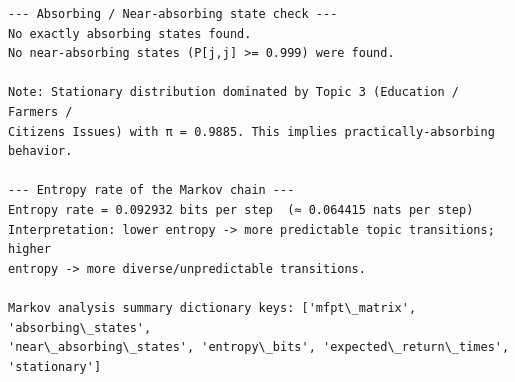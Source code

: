 \documentclass[11pt]{article}
\makeatletter
\newcommand{\boxspacing}{\kern\kvtcb@left@rule\kern\kvtcb@boxsep}
\newcommand{\prompt}[4]{
        {\ttfamily\llap{{\color{#2}[#3]:\hspace{3pt}#4}}\vspace{-\baselineskip}}
    }
\makeatother
\begin{document}
\begin{Verbatim}[commandchars=\\\{\}]
--- Absorbing / Near-absorbing state check ---
No exactly absorbing states found.
No near-absorbing states (P[j,j] >= 0.999) were found.

Note: Stationary distribution dominated by Topic 3 (Education / Farmers /
Citizens Issues) with π = 0.9885. This implies practically-absorbing behavior.

--- Entropy rate of the Markov chain ---
Entropy rate = 0.092932 bits per step  (≈ 0.064415 nats per step)
Interpretation: lower entropy -> more predictable topic transitions; higher
entropy -> more diverse/unpredictable transitions.

Markov analysis summary dictionary keys: ['mfpt\_matrix', 'absorbing\_states',
'near\_absorbing\_states', 'entropy\_bits', 'expected\_return\_times', 'stationary']
    \end{Verbatim}

    \begin{tcolorbox}[breakable, size=fbox, boxrule=1pt, pad at break*=1mm,colback=cellbackground, colframe=cellborder]
\prompt{In}{incolor}{ }{\boxspacing}
\begin{Verbatim}[commandchars=\\\{\}]

\end{Verbatim}
\end{tcolorbox}


    
    
    
\end{document}
